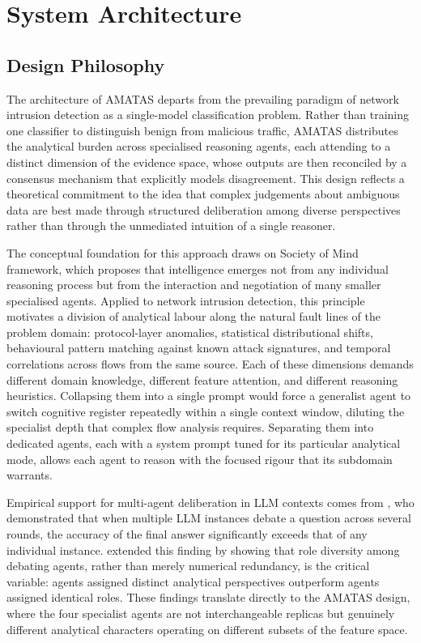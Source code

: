 \chapter{System Architecture}
\label{ch:architecture}

\section{Design Philosophy}
\label{sec:design-philosophy}

The architecture of AMATAS departs from the prevailing paradigm of network intrusion detection as a single-model classification problem. Rather than training one classifier to distinguish benign from malicious traffic, AMATAS distributes the analytical burden across specialised reasoning agents, each attending to a distinct dimension of the evidence space, whose outputs are then reconciled by a consensus mechanism that explicitly models disagreement. This design reflects a theoretical commitment to the idea that complex judgements about ambiguous data are best made through structured deliberation among diverse perspectives rather than through the unmediated intuition of a single reasoner.

The conceptual foundation for this approach draws on \textcite{Minsky1986} Society of Mind framework, which proposes that intelligence emerges not from any individual reasoning process but from the interaction and negotiation of many smaller specialised agents. Applied to network intrusion detection, this principle motivates a division of analytical labour along the natural fault lines of the problem domain: protocol-layer anomalies, statistical distributional shifts, behavioural pattern matching against known attack signatures, and temporal correlations across flows from the same source. Each of these dimensions demands different domain knowledge, different feature attention, and different reasoning heuristics. Collapsing them into a single prompt would force a generalist agent to switch cognitive register repeatedly within a single context window, diluting the specialist depth that complex flow analysis requires. Separating them into dedicated agents, each with a system prompt tuned for its particular analytical mode, allows each agent to reason with the focused rigour that its subdomain warrants.

Empirical support for multi-agent deliberation in LLM contexts comes from \textcite{Du2023}, who demonstrated that when multiple LLM instances debate a question across several rounds, the accuracy of the final answer significantly exceeds that of any individual instance. \textcite{Chan2023} extended this finding by showing that role diversity among debating agents, rather than merely numerical redundancy, is the critical variable: agents assigned distinct analytical perspectives outperform agents assigned identical roles. These findings translate directly to the AMATAS design, where the four specialist agents are not interchangeable replicas but genuinely different analytical characters operating on different subsets of the feature space.

